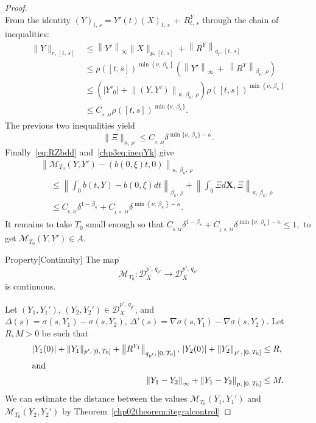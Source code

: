 \documentclass[AHL,Unicode,longabstracts,published]{cedram}
\newcommand{\scrD}{\mathscr{D}}
\newcommand{\calM}{\mathcal{M}}
\begin{document}
\begin{proof}
\[\]
From the identity $(Y)_{t,\,s} =Y'(t) (X)_{t,\,s}\,+\, R^Y_{t,\,s}$ through the chain of inequalities:
\begin{align*}
\|Y\|_{r,\,[t,\,s]}&\leq \left\|Y'\right\|_{\infty}\|X\|_{p,\,[t,\,s]}+\left\|R^{Y}\right\|_{q_{r},\,[t,\,s]}\\
&\leq \rho([t,s])^{\min\left\{\nu,\,\beta_{\kappa}\right\}}\left(\left\|Y'\right\|_{\infty}\, +\,\left\|R^{Y}\right\|_{\beta_{\kappa},\,\rho}\right)\\
&\leq \left(\left|Y'_0\right|+\left\|\left(Y,Y'\right)\right\|_{\kappa,\,\beta_{\kappa},\,\rho}\right)\rho([t,s])^{\min\left\{\nu,\,\beta_{\kappa}\right\}}\\
&\leq C_{_{\sigma,\,M}}\rho([t,s])^{\min\{\nu,\, \beta_{\kappa}\}}.
\end{align*}
The previous two inequalities yield
\begin{equation}\label{chp3eq:ineqYk}
\|\Xi\|_{\kappa,\,\rho}\leq C_{_{\sigma,\,M}}\delta^{\min\{\nu,\,\beta_{\kappa}\}-\kappa}.
\end{equation}
Finally~\eqref{eq:RZbdd} and~\eqref{chp3eq:ineqYk} give
\begin{multline}
\left\|\calM_{T_0} \left(Y,Y'\right)-(b(0, \xi)t, 0)\right\|_{\kappa,\,\beta_{\kappa},\,\rho}\\
\begin{aligned}
&\leq \left\|\int_0^{\cdot}b(t, Y)-b(0, \xi) dt\right\|_{\beta_{\kappa},\,\rho}+\left\|\int_0^{\cdot}\Xi d\bm{X}, \Xi\right\|_{\kappa,\,\beta_{\kappa},\,\rho}\\
&\leq C_{_{b,\,M}} \delta^{1-\beta_{\kappa}}+C_{_{\xi,\,\sigma,\,M}}\delta^{\min\left\{\nu,\,\beta_{\kappa}\right\}-\kappa}.
\end{aligned}
\end{multline}
It remains to take $T_0$ small enough so that $C_{_{b,\,M}} \delta^{1-\beta_{\kappa}}+C_{_{\xi,\, \sigma,\,M}}\delta^{\min\{\nu,\,\beta_{\kappa}\}-\kappa}\leq 1,$ to get $\calM_{T_0}(Y,Y')\in A$.

\begin{enonce}{Property}[Continuity]
The map
\[
\calM_{T_0}\colon \scrD^{p',\,q_{p'}}_{X }\to \scrD^{p',\,q_{p'}}_{X }
\]
is continuous.
\end{enonce}

Let $(Y_1,Y_1'),\, (Y_2,Y_2')\in \scrD^{p',\,q_{p'}}_{X }$, and $\Delta(s)=\sigma(s,Y_{1})-\sigma(s,Y_{2}),\, \Delta'(s)=\nabla\sigma(s,Y_{1})-\nabla\sigma(s,Y_{2})$. Let $R, M>0$ be such that
\begin{align*}
\left|Y_1(0)\right|+\|Y_1\|_{p',\,\left[0,\,T_0\right]} +\left\|R^{Y_1}\right\|_{q_{p'},\,\left[0,\,T_0\right]},\,\left|Y_2(0)\right|+\left\|Y_2\right\|_{p',\,\left[0,\,T_0\right]} &\leq R,
\\
\intertext{and}
\left\|Y_1-Y_2\right\|_{\infty}+\left\|Y_1-Y_2\right\|_{p,\,\left[0,\,T_0\right]} &\leq M.
\end{align*}
We can estimate the distance between the values $\calM_{T_0}(Y_1,Y_1')$ and $\calM_{T_0}(Y_2,Y_2')$ by Theorem~\ref{chp02theorem:itegralcontrol}


\end{proof}
\end{document}
